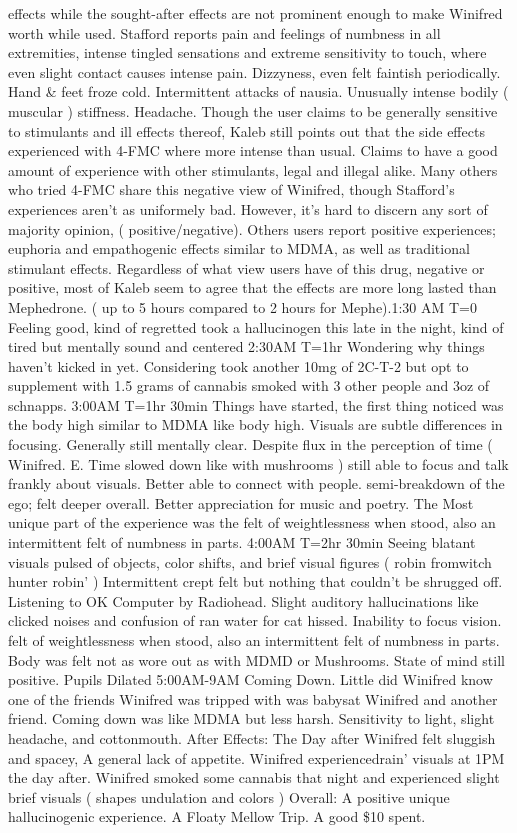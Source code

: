\documentclass[12pt]{book}
\begin{document}
effects while the sought-after effects are not prominent enough to make Winifred worth while used. Stafford reports pain and feelings of numbness in all extremities, intense tingled sensations and extreme sensitivity to touch, where even slight contact causes intense pain. Dizzyness, even felt faintish periodically. Hand \& feet froze cold. Intermittent attacks of nausia. Unusually intense bodily ( muscular ) stiffness. Headache. Though the user claims to be generally sensitive to stimulants and ill effects thereof, Kaleb still points out that the side effects experienced with 4-FMC where more intense than usual. Claims to have a good amount of experience with other stimulants, legal and illegal alike. Many others who tried 4-FMC share this negative view of Winifred, though Stafford's experiences aren't as uniformely bad. However, it's hard to discern any sort of majority opinion, ( positive/negative). Others users report positive experiences; euphoria and empathogenic effects similar to MDMA, as well as traditional stimulant effects. Regardless of what view users have of this drug, negative or positive, most of Kaleb seem to agree that the effects are more long lasted than Mephedrone. ( up to 5 hours compared to 2 hours for Mephe).1:30 AM T=0 Feeling good, kind of regretted took a hallucinogen this late in the night, kind of tired but mentally sound and centered 2:30AM T=1hr Wondering why things haven't kicked in yet. Considering took another 10mg of 2C-T-2 but opt to supplement with 1.5 grams of cannabis smoked with 3 other people and 3oz of schnapps. 3:00AM T=1hr 30min Things have started, the first thing noticed was the body high similar to MDMA like body high. Visuals are subtle differences in focusing. Generally still mentally clear. Despite flux in the perception of time ( Winifred. E. Time slowed down like with mushrooms ) still able to focus and talk frankly about visuals. Better able to connect with people. semi-breakdown of the ego; felt deeper overall. Better appreciation for music and poetry. The Most unique part of the experience was the felt of weightlessness when stood, also an intermittent felt of numbness in parts. 4:00AM T=2hr 30min Seeing blatant visuals pulsed of objects, color shifts, and brief visual figures ( robin fromwitch hunter robin' ) Intermittent crept felt but nothing that couldn't be shrugged off. Listening to OK Computer by Radiohead. Slight auditory hallucinations like clicked noises and confusion of ran water for cat hissed. Inability to focus vision. felt of weightlessness when stood, also an intermittent felt of numbness in parts. Body was felt not as wore out as with MDMD or Mushrooms. State of mind still positive. Pupils Dilated 5:00AM-9AM Coming Down. Little did Winifred know one of the friends Winifred was tripped with was babysat Winifred and another friend. Coming down was like MDMA but less harsh. Sensitivity to light, slight headache, and cottonmouth. After Effects: The Day after Winifred felt sluggish and spacey, A general lack of appetite. Winifred experiencedrain' visuals at 1PM the day after. Winifred smoked some cannabis that night and experienced slight brief visuals ( shapes undulation and colors ) Overall: A positive unique hallucinogenic experience. A Floaty Mellow Trip. A good \$10 spent.
\end{document}
